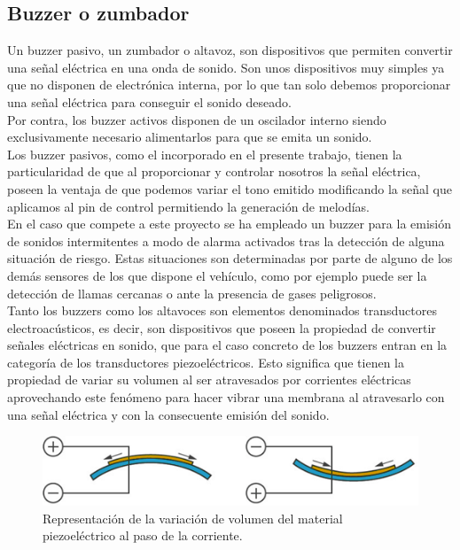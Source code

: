 \subsection{Buzzer o zumbador}

Un buzzer pasivo, un zumbador o altavoz, son dispositivos que permiten convertir una señal eléctrica en una onda de sonido. Son unos dispositivos muy simples ya que no disponen 
de electrónica interna, por lo que tan solo debemos proporcionar una señal eléctrica para conseguir el sonido deseado.\\

Por contra, los buzzer activos disponen de un oscilador interno siendo exclusivamente necesario alimentarlos para que se emita un sonido.\\

Los buzzer pasivos, como el incorporado en el presente trabajo, tienen la particularidad de que al proporcionar y controlar nosotros la señal eléctrica, poseen la ventaja de
que podemos variar el tono emitido modificando la señal que aplicamos al pin de control permitiendo la generación de melodías.\\

En el caso que compete a este proyecto se ha empleado un buzzer para la emisión de sonidos intermitentes a modo de alarma activados tras la detección de alguna situación de riesgo.
Estas situaciones son determinadas por parte de alguno de los demás sensores de los que dispone el vehículo, como por ejemplo
puede ser la detección de llamas cercanas o ante la presencia de gases peligrosos.\\


Tanto los buzzers como los altavoces son elementos denominados transductores electroacústicos, es decir, son dispositivos que poseen la propiedad de convertir señales eléctricas
en sonido, que para el caso concreto de los buzzers entran en la categoría de los transductores piezoeléctricos. Esto significa que tienen la propiedad de variar su volumen al 
ser atravesados por corrientes eléctricas aprovechando este fenómeno para hacer vibrar una membrana al atravesarlo con una señal eléctrica y con la consecuente emisión del sonido.\\

 \begin{figure}[H]
  \begin{center}
    \includegraphics[scale=0.6]{imagenes/diagrama_buzzer.png}
  \end{center}
  \caption{Representación de la variación de volumen del material piezoeléctrico al paso de la corriente.}
  \label{figura:sensor_mq_2_potenciometro}
\end{figure}


